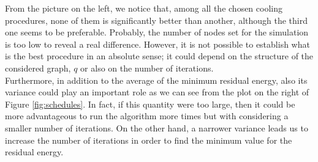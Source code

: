 From the picture on the left, we notice that, among all the chosen cooling procedures, none of them is significantly better than another, although the third one seems to be preferable. 
Probably, the number of nodes set for the simulation is too low to reveal a real difference.
However, it is not possible to establish what is the best procedure in an absolute sense; it could depend on the structure of the considered graph, $q$ or also on the number of iterations.\\
Furthermore, in addition to the average of the minimum residual energy, also its variance could play an important role as we can see from the plot on the right of Figure \ref{fig:schedules}. 
In fact, if this quantity were too large, then it could be more advantageous to run the algorithm more times but with considering a smaller number of iterations. 
On the other hand, a narrower variance leads us to increase the number of iterations in order to find the minimum value for the residual energy. 
%
%	
% 	
